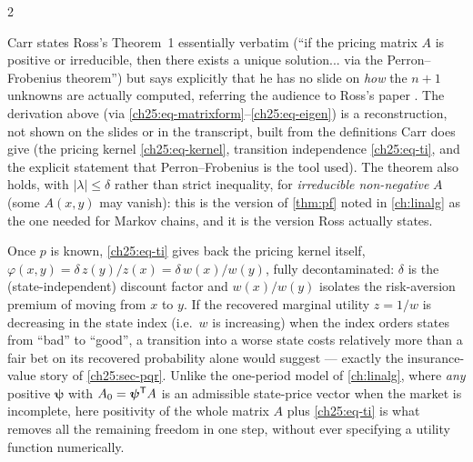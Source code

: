 \begin{paracol}{2}
\begin{coursenote}
Carr states Ross's Theorem~1 essentially verbatim (``if the pricing matrix $A$ is positive or irreducible,
then there exists a unique solution... via the Perron--Frobenius theorem'') but says explicitly that he has
no slide on \emph{how} the $n+1$ unknowns are actually computed, referring the audience to Ross's paper
. The derivation above (via \eqref{ch25:eq-matrixform}--\eqref{ch25:eq-eigen}) is a
reconstruction, not shown on the slides or in the transcript, built from the definitions Carr does give
(the pricing kernel \eqref{ch25:eq-kernel}, transition independence \eqref{ch25:eq-ti}, and the explicit
statement that Perron--Frobenius is the tool used). The theorem also holds, with $|\lambda|\le\delta$ rather
than strict inequality, for \emph{irreducible non-negative} $A$ (some $A(x,y)$ may vanish): this is the
version of \cref{thm:pf} noted in \cref{ch:linalg} as the one needed for Markov chains, and it is the
version Ross actually states.
\end{coursenote}

\begin{finance}
Once $p$ is known, \eqref{ch25:eq-ti} gives back the pricing kernel itself,
$\varphi(x,y)=\delta\,z(y)/z(x)=\delta\,w(x)/w(y)$, fully decontaminated: $\delta$ is the (state-independent)
discount factor and $w(x)/w(y)$ isolates the risk-aversion premium of moving from $x$ to $y$. If the recovered marginal utility
$z=1/w$ is decreasing in the state index (i.e.\ $w$ is increasing) when the index orders states from
``bad'' to ``good'', a transition into a worse state costs relatively more than a fair bet on its recovered
probability alone would suggest --- exactly the insurance-value story of \cref{ch25:sec-pqr}. Unlike the
one-period model of \cref{ch:linalg}, where \emph{any} positive $\bm\psi$ with $A_0=\bm\psi^{\mathsf T} A$ is an
admissible state-price vector when the market is incomplete, here positivity of the whole matrix $A$ plus
\eqref{ch25:eq-ti} is what removes all the remaining freedom in one step, without ever specifying a utility
function numerically.
\end{finance}


\end{paracol}
